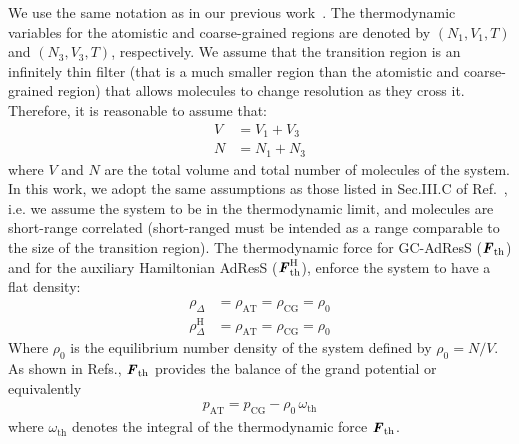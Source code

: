 \documentclass[a4paper,preprint,unsortedaddress]{revtex4-1}
\newcommand{\vect}[1]{\textbf{\textit{#1}}}
\newcommand{\AT}{{\textrm{{AT}}}}
\newcommand{\CG}{{\textrm{CG}}}
\newcommand{\HY}{{\Delta}}
\newcommand{\thf}{{\textrm{th}}}
\newcommand{\hadress}{{\textrm{H}}}
\begin{document}
{We use the same notation as in our previous work~\cite{prx}.
The thermodynamic variables for the atomistic and coarse-grained regions
are denoted by $(N_1, V_1, T)$ and $(N_3, V_3, T)$, respectively.
We assume that the transition region is an infinitely thin filter (that is a much smaller region than the atomistic and coarse-grained region) that allows molecules
to change resolution as they cross it. Therefore, it is 
reasonable to assume that:
\begin{align}
  V &= V_1 + V_3\\
  N &= N_1 + N_3
\end{align}
where $V$ and $N$ are the total volume and total number of
molecules of the system. In this work, we adopt the same
assumptions as those listed in Sec.III.C of Ref.~\cite{prx},
i.e. we assume the system to be in the thermodynamic limit, and molecules are short-range
correlated (short-ranged must be intended as a range comparable to the size of the transition region). The thermodynamic force for GC-AdResS ($\vect F_\thf$) and for the auxiliary Hamiltonian AdResS ($\vect F^\hadress_\thf$),
enforce the system to have a flat density:
\begin{align}
  \rho_\HY &= \rho_\AT = \rho_\CG = \rho_0\\
  \rho_\HY^\hadress &= \rho_\AT = \rho_\CG = \rho_0
\end{align}
Where $\rho_0$ is the equilibrium number density of the system defined by $\rho_0 = N/V$.
As shown in Refs.\cite{prl12, prx}, $\vect F_\thf$ provides the
balance of the grand potential or equivalently
\begin{align}\label{eqn:peq}
  p_\AT = p_\CG - \rho_0 \,\omega_\thf 
\end{align}
where $ \omega_\thf$ denotes the integral of the thermodynamic force $\vect F_\thf$. \\

}
\end{document}
